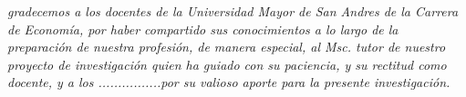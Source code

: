 \begin{Agradecimientos}

\begin{center}

{\fontsize{30}{0}\selectfont{A}}
\textit{gradecemos a los  docentes de la Universidad Mayor de San Andres de la Carrera de Economía, por haber compartido sus conocimientos a lo largo de la preparación de nuestra profesión, de manera especial, al Msc. tutor de nuestro proyecto de investigación quien ha guiado con su paciencia, y su rectitud como docente, y a los ................por su valioso aporte para la presente  investigación.}


\end{center}

{\selectfont{Ejemplo}}
\end{Agradecimientos}

% 
%
%
%
% 
%
%
